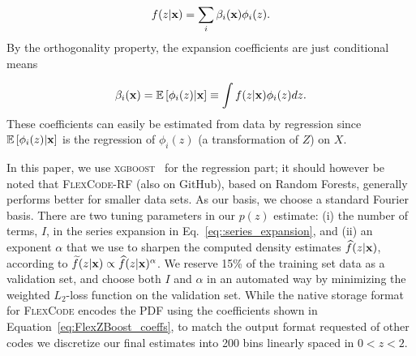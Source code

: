 \begin{equation}
f(z|{\mathbf{x}})=\sum_{i}\beta_{i }({\mathbf{x}})\phi_i(z). \label{eq::series_expansion}
\end{equation}
By the orthogonality property, the expansion coefficients are just conditional means

\begin{equation}
\beta_{i }({\mathbf{x}}) =  \mathbb{E}\left[\phi_i(z)|{\mathbf{x}}\right] \equiv \int f(z|{\mathbf{x}})   \phi_i(z) dz. \label{eq:FlexZBoost_coeffs}
\end{equation}
These coefficients can easily be estimated from data by regression since $\mathbb{E}\left[\phi_i(z)|{\mathbf{x}}\right]$ is the regression of $\phi_i(z)$ (a transformation of $Z$) on $X$.

In this paper, we use \textsc{xgboost}~\citep{Chen:16} for the regression part; it should however be noted that \textsc{FlexCode-RF} (also on GitHub), based on Random Forests, generally performs better for smaller data sets. As our basis, we choose a standard Fourier basis. There are two tuning parameters in our $p(z)$ estimate: (i) the number of terms, $I$, in the series expansion in Eq.~\ref{eq::series_expansion}, and (ii) an exponent $\alpha$ that we use to sharpen the computed density estimates $\widehat{f}(z|{\mathbf{x}})$, according to $\widetilde{f}(z|{\mathbf{x}}) \propto \widehat{f}(z|{\mathbf{x}})^\alpha$.  We reserve 15\% of the training set data as a validation set, and choose both $I$ and $\alpha$ in an automated way by minimizing the weighted $L_2$-loss function \citep[Eq. 5 in][]{Izbicki:17} on the  validation set.  While the native storage format for \textsc{FlexCode} encodes the PDF using the coefficients shown in Equation~\ref{eq:FlexZBoost_coeffs}, to match the output format requested of other codes we discretize our final estimates into 200 bins linearly spaced in $0 < z < 2$.





%
%

